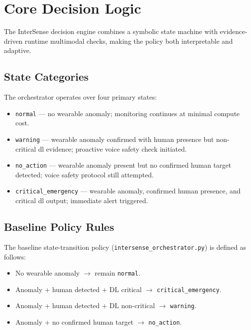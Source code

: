 \documentclass[10pt,twocolumn,a4paper]{article}
\begin{document}
\section{Core Decision Logic}

The InterSense decision engine combines a symbolic state machine with
evidence-driven runtime multimodal checks, making the policy both
interpretable and adaptive.

\subsection{State Categories}

The orchestrator operates over four primary states:
\begin{itemize}
  \item \texttt{normal} — no wearable anomaly; monitoring continues at
        minimal compute cost.
  \item \texttt{warning} — wearable anomaly confirmed with human
        presence but non-critical \gls{dl} evidence; proactive voice
        safety check initiated.
  \item \texttt{no\_action} — wearable anomaly present but no
        confirmed human target detected; voice safety protocol still
        attempted.
  \item \texttt{critical\_emergency} — wearable anomaly, confirmed
        human presence, and critical \gls{dl} output; immediate alert
        triggered.
\end{itemize}

\subsection{Baseline Policy Rules}

The baseline state-transition policy (\texttt{intersense\_orchestrator.py})
is defined as follows:
\begin{itemize}
  \item No wearable anomaly $\rightarrow$ remain \texttt{normal}.
  \item Anomaly + human detected + DL critical $\rightarrow$
        \texttt{critical\_emergency}.
  \item Anomaly + human detected + DL non-critical $\rightarrow$
        \texttt{warning}.
  \item Anomaly + no confirmed human target $\rightarrow$
        \texttt{no\_action}.
\end{itemize}
\end{document}
